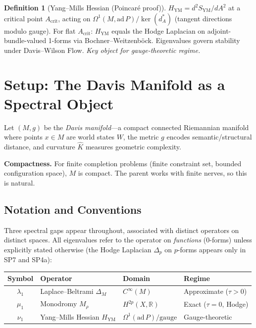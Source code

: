 \documentclass[11pt]{article}
\theoremstyle{definition}
\newtheorem{definition}[theorem]{Definition}
\theoremstyle{remark}
\newcommand{\HYM}{H_{\mathrm{YM}}}
\newcommand{\SYM}{S_{\mathrm{YM}}}
\begin{document}
\begin{definition}[Yang--Mills Hessian (Poincar\'{e} proof)]\label{def:YMH}
$\HYM = d^2\SYM/dA^2$ at a critical point $A_{\mathrm{crit}}$, acting on $\Omega^1(M, \mathrm{ad}\,P)/\ker(d_A^*)$ (tangent directions modulo gauge). For flat $A_{\mathrm{crit}}$: $\HYM$ equals the Hodge Laplacian on adjoint-bundle-valued 1-forms via Bochner--Weitzenb\"{o}ck. Eigenvalues govern stability under Davis--Wilson Flow. \emph{Key object for gauge-theoretic regime.}
\end{definition}


\section{Setup: The Davis Manifold as a Spectral Object}
\label{sec:setup}

Let $(M, g)$ be the \emph{Davis manifold}---a compact connected Riemannian manifold where points $x \in M$ are world states $W$, the metric $g$ encodes semantic/structural distance, and curvature $\hat{K}$ measures geometric complexity.

\textbf{Compactness.} For finite completion problems (finite constraint set, bounded configuration space), $M$ is compact. The parent works with finite nerves, so this is natural.

\subsection{Notation and Conventions}

Three spectral gaps appear throughout, associated with distinct operators on distinct spaces. All eigenvalues refer to the operator on \emph{functions} (0-forms) unless explicitly stated otherwise (the Hodge Laplacian $\Delta_p$ on $p$-forms appears only in SP7 and SP4a):

\begin{center}
\begin{tabular}{clll}
\toprule
Symbol & Operator & Domain & Regime \\
\midrule
$\lambda_1$ & Laplace--Beltrami $\Delta_M$ & $C^\infty(M)$ & Approximate ($\tau > 0$) \\
$\mu_1$ & Monodromy $M_\rho$ & $H^{2p}(X, \mathbb{R})$ & Exact ($\tau = 0$, Hodge) \\
$\nu_1$ & Yang--Mills Hessian $\HYM$ & $\Omega^1(\mathrm{ad}\,P)/\text{gauge}$ & Gauge-theoretic \\
\bottomrule
\end{tabular}
\end{center}
\end{document}
